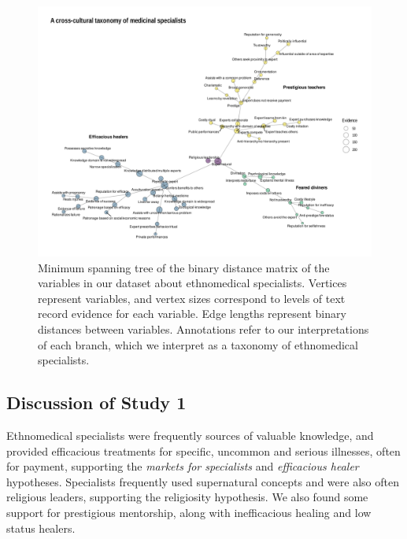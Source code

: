 \documentclass[
  11pt,
]{article}
\begin{document}
\begin{landscape}

\begin{figure}[p]

{\centering \includegraphics{images/ethnomedicineMST} 

}

\caption{Minimum spanning tree of the binary distance matrix of the variables in our dataset about ethnomedical specialists. Vertices represent variables, and vertex sizes correspond to levels of text record evidence for each variable. Edge lengths represent binary distances between variables. Annotations refer to our interpretations of each branch, which we interpret as a taxonomy of ethnomedical specialists.}\label{fig:ehrafmsttaxonomy}
\end{figure}

\end{landscape}

\hypertarget{discussion-of-study-1}{%
\subsection{Discussion of Study 1}\label{discussion-of-study-1}}

Ethnomedical specialists were frequently sources of valuable knowledge, and provided efficacious treatments for specific, uncommon and serious illnesses, often for payment, supporting the \emph{markets for specialists} and \emph{efficacious healer} hypotheses. Specialists frequently used supernatural concepts and were also often religious leaders, supporting the religiosity hypothesis. We also found some support for prestigious mentorship, along with inefficacious healing and low status healers.
\end{document}
